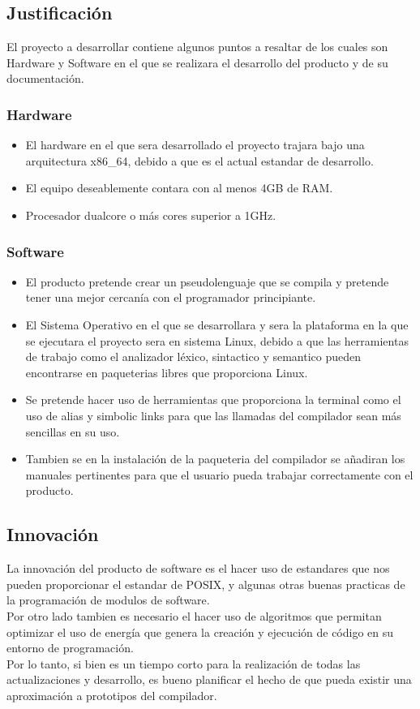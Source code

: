 \documentclass[10pt,executivepaper]{article}
\begin{document}
\subsection{Justificación}
El proyecto a desarrollar contiene algunos puntos a resaltar de los cuales son Hardware y Software en el que se realizara el desarrollo del producto y de su documentación.
\subsubsection{Hardware}
\begin{itemize}
  \item El hardware en el que sera desarrollado el proyecto trajara bajo una arquitectura x86\_64, debido a que es el actual estandar de desarrollo.
  \item El equipo deseablemente contara con al menos 4GB de RAM.
  \item Procesador dualcore o más cores superior a 1GHz.
\end{itemize}
\subsubsection{Software}
\begin{itemize}
  \item El producto pretende crear un pseudolenguaje que se compila y pretende tener una mejor cercanía con el programador principiante.
  \item El Sistema Operativo en el que se desarrollara y sera la plataforma en la que se ejecutara el proyecto sera en sistema Linux, debido a que las herramientas de trabajo como el analizador léxico, sintactico y semantico pueden encontrarse en paqueterias libres que proporciona Linux.
  \item Se pretende hacer uso de herramientas que proporciona la terminal como el uso de alias y simbolic links para que las llamadas del compilador sean más sencillas en su uso.
  \item Tambien se en la instalación de la paqueteria del compilador se añadiran los manuales pertinentes para que el usuario pueda trabajar correctamente con el producto.
\end{itemize}

\subsection{Innovación}
La innovación del producto de software es el hacer uso de estandares que nos pueden proporcionar el estandar de POSIX, y algunas otras buenas practicas de la programación de modulos de software.\\
Por otro lado tambien es necesario el hacer uso de algoritmos que permitan optimizar el uso de energía que genera la creación y ejecución de código en su entorno de programación.\\
Por lo tanto, si bien es un tiempo corto para la realización de todas las actualizaciones y desarrollo, es bueno planificar el hecho de que pueda existir una aproximación a prototipos del compilador.
\end{document}
